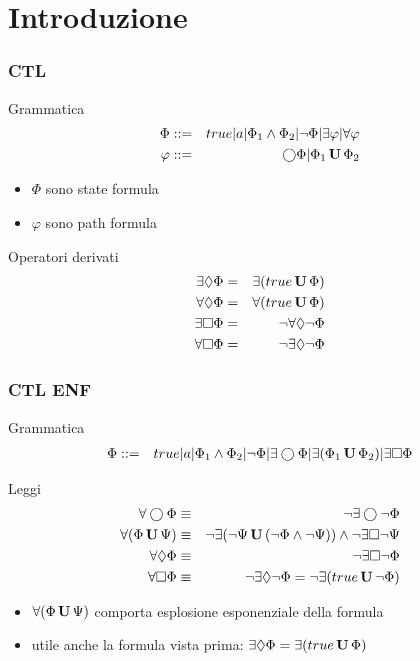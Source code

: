 \section{Introduzione}
\begin{frame}
  \frametitle{\ac{CTL}}
  \begin{block}{Grammatica}
   \begin{eqnarray*}
     \Phi &::=& true|a|\Phi_1\land
     \Phi_2|\neg\Phi|\exists\varphi|\forall\varphi\\
     \varphi &::=& \bigcirc\Phi|\Phi_1\,\mathbf{U}\,\Phi_2
   \end{eqnarray*}
  \end{block}
  \begin{itemize}
  \item $\Phi$ sono state formula
  \item $\varphi$ sono path formula
  \end{itemize}
  \begin{block}{Operatori derivati}
    \begin{eqnarray*}
      \exists\Diamond\Phi &=& \exists(true\,\mathbf{U}\,\Phi)\\
      \forall\Diamond\Phi &=& \forall(true\,\mathbf{U}\,\Phi)\\
      \exists\Box\Phi &=& \neg\forall\Diamond\neg\Phi\\
      \forall\Box\Phi &=& \neg\exists\Diamond\neg\Phi
    \end{eqnarray*}
  \end{block}
\end{frame}

\begin{frame}
  \frametitle{\ac{CTL} \ac{ENF}}
  \begin{block}{Grammatica}
   \begin{eqnarray*}
     \Phi &::=& true|a|\Phi_1\land
     \Phi_2|\neg\Phi|\exists\bigcirc\Phi|\exists(\Phi_1\,\mathbf{U}\,\Phi_2)|
     \exists\Box\Phi
   \end{eqnarray*}
  \end{block}
  \begin{block}{Leggi}
    \begin{eqnarray*}
      \forall\bigcirc\Phi&\equiv&\neg\exists\bigcirc\neg\Phi\\
      \forall(\Phi\,\mathbf{U}\,\Psi)&\equiv&\neg\exists(\neg\Psi\,\mathbf{U}\,(\neg\Phi\land\neg\Psi))\land\neg\exists\Box\neg\Psi\\
      \forall\Diamond\Phi&\equiv&\neg\exists\Box\neg\Phi\\
      \forall\Box\Phi&\equiv&\neg\exists\Diamond\neg\Phi=\neg\exists(true\,\mathbf{U}\,\neg\Phi)
    \end{eqnarray*}
  \end{block}
  \begin{itemize}
  \item $\forall(\Phi\,\mathbf{U}\,\Psi)$ comporta esplosione esponenziale
    della formula
  \item utile anche la formula vista prima: $\exists\Diamond\Phi = \exists(true\,\mathbf{U}\,\Phi)$
  \end{itemize}
\end{frame}

